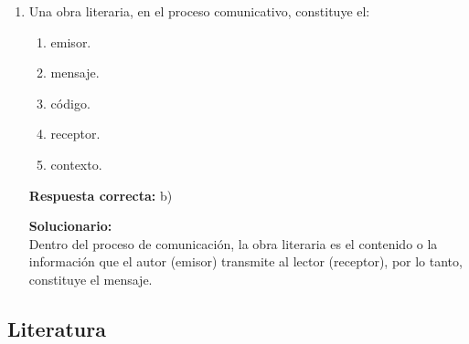 \begin{enumerate}
El propósito comunicativo del texto es:

\begin{enumerate}[label=\alph*)]
	\item advertir.
	\item convencer.
	\item deleitar.
	\item informar.
	\item mostrar.
\end{enumerate}

\textbf{Respuesta correcta:} a)

\vspace{2mm}
\textbf{Solucionario:}\\
El texto tiene una función apelativa o exhortativa; su propósito es advertir y dar pautas de comportamiento o instrucciones necesarias para actuar ante una situación de emergencia.

\vspace{6mm}

\item Una obra literaria, en el proceso comunicativo, constituye el:

\begin{enumerate}[label=\alph*)]
	\item emisor.
	\item mensaje.
	\item código.
	\item receptor.
	\item contexto.
\end{enumerate}

\textbf{Respuesta correcta:} b)

\vspace{2mm}
\textbf{Solucionario:}\\
Dentro del proceso de comunicación, la obra literaria es el contenido o la información que el autor (emisor) transmite al lector (receptor), por lo tanto, constituye el mensaje.

\vspace{6mm}
	
\end{enumerate}


\subsection*{Literatura}

